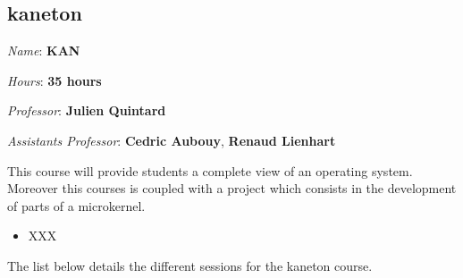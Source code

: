 \begin{multicols}{2}
%
%

\section{kaneton}

\textit{Name}: \textbf{KAN}

\textit{Hours}: \textbf{35 hours}

\textit{Professor}: \textbf{Julien Quintard}

\textit{Assistants Professor}: \textbf{Cedric Aubouy},
                               \textbf{Renaud Lienhart}

This course will provide students a complete view of an operating system.
Moreover this courses is coupled with a project which consists in the
development of parts of a microkernel.

\begin{itemize}
  \item
    XXX
\end{itemize}

The list below details the different sessions for the kaneton course.


\end{multicols}
